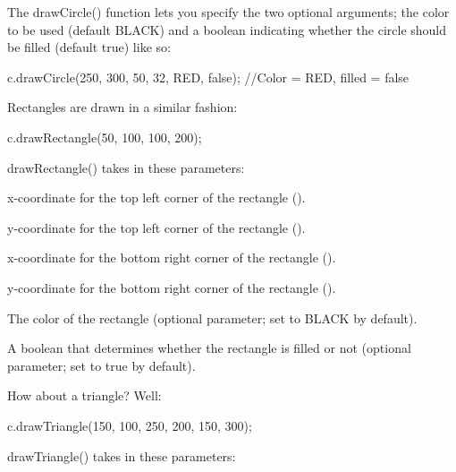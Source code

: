 The {\ttfamily draw\-Circle()} function lets you specify the two optional arguments; the color to be used (default {\ttfamily B\-L\-A\-C\-K}) and a boolean indicating whether the circle should be filled (default {\ttfamily true}) like so\-:


\begin{DoxyCode}
c.drawCircle(250, 300, 50, 32, RED, \textcolor{keyword}{false});  \textcolor{comment}{//Color = RED, filled = false}
\end{DoxyCode}


Rectangles are drawn in a similar fashion\-:


\begin{DoxyCode}
c.drawRectangle(50, 100, 100, 200);
\end{DoxyCode}


{\ttfamily draw\-Rectangle()} takes in these parameters\-:


\begin{DoxyItemize}
\item x-\/coordinate for the top left corner of the rectangle ({}).
\item y-\/coordinate for the top left corner of the rectangle ({}).
\item x-\/coordinate for the bottom right corner of the rectangle ({}).
\item y-\/coordinate for the bottom right corner of the rectangle ({}).
\item The color of the rectangle (optional parameter; set to {\ttfamily B\-L\-A\-C\-K} by default).
\item A boolean that determines whether the rectangle is filled or not (optional parameter; set to {\ttfamily true} by default).
\end{DoxyItemize}

How about a triangle? Well\-:


\begin{DoxyCode}
c.drawTriangle(150, 100, 250, 200, 150, 300);
\end{DoxyCode}


{\ttfamily draw\-Triangle()} takes in these parameters\-:


